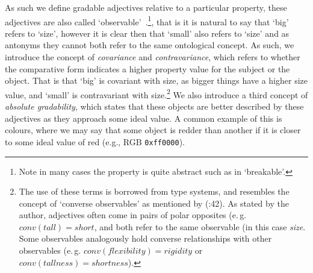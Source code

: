 \documentclass[11pt]{article}
\begin{document}
As such we define gradable adjectives relative to a particular 
property, these adjectives are also called `observable'~\cite{Bennett06kr}.\footnote{Note in many cases the property is quite abstract such as in 
`breakable'.}, that is it is natural to say that `big' refers to 
`size', however it is clear then that `small' also refers to `size' and as antonyms 
they cannot both refer to the same ontological concept. As such, we introduce 
the concept of \emph{covariance} and \emph{contravariance}, which refers to 
whether the comparative form indicates a higher property value for the subject 
or the object. That is that `big' is covariant with size, as bigger things have 
a higher size value, and `small' is contravariant with size.\footnote{
    The use of these terms is borrowed from type systems, and resembles the concept of `converse observables' as mentioned by (\cite{Bennett06kr}:42). As stated by the author, adjectives often come in pairs of polar opposites (e.\,g. $conv(tall)=short$, and both refer to the same observable (in this case \textit{size}. Some observables analogously hold converse relationships with other observables (e.\,g. $conv(flexibility)=rigidity$ or $conv(tallness)=shortness$).} We also introduce 
a third concept of \emph{absolute gradability}, which states that these objects 
are better described by these adjectives as they approach some ideal value. 
A common example of this is colours, where we may say that some object is 
redder than another if it is closer to some ideal value of red 
(e.g., RGB {\tt 0xff0000}).
\end{document}
